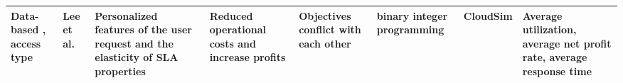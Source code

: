 \begin{sidewaystable*}[p]
{\begin{tabular}{|g{2cm} p{2cm} p{2cm} p{2cm} p{2cm} p{2cm} p{2cm} p{1.9cm}|}
Data-based , access type & Lee et al.~\cite{lee2012profit} &  Personalized
features of the user request and the elasticity of SLA properties & Reduced operational costs and increase profits & Objectives conflict with each other & binary integer programming & CloudSim & Average utilization, average net profit rate, average response time  
\\ \hline
\end{tabular}
}
\end{sidewaystable*}
